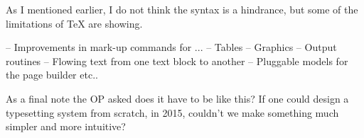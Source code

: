 \documentclass[pagestyleset=scrheadings]{scrbook}
\begin{document}
As I mentioned earlier, I do not think the syntax is a hindrance, but some of the limitations of TeX are showing. 

-- Improvements in mark-up commands for ...
-- Tables
-- Graphics
-- Output routines
-- Flowing text from one text block to another
-- Pluggable models for the page builder etc..

As a final note the OP asked does it have to be like this? If one could design a typesetting system from scratch, in 2015, couldn’t we make something much simpler and more intuitive? 


 
\end{document}
